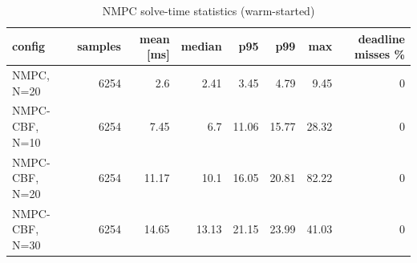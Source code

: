 \begin{table}
\caption{NMPC solve-time statistics (warm-started)}
\label{tab:solve_time}
\begin{tabular}{lrrrrrrr}
\toprule
config & samples & mean [ms] & median & p95 & p99 & max & deadline misses \% \\
\midrule
NMPC, N=20 & 6254 & 2.6 & 2.41 & 3.45 & 4.79 & 9.45 & 0 \\
NMPC-CBF, N=10 & 6254 & 7.45 & 6.7 & 11.06 & 15.77 & 28.32 & 0 \\
NMPC-CBF, N=20 & 6254 & 11.17 & 10.1 & 16.05 & 20.81 & 82.22 & 0 \\
NMPC-CBF, N=30 & 6254 & 14.65 & 13.13 & 21.15 & 23.99 & 41.03 & 0 \\
\bottomrule
\end{tabular}
\end{table}
